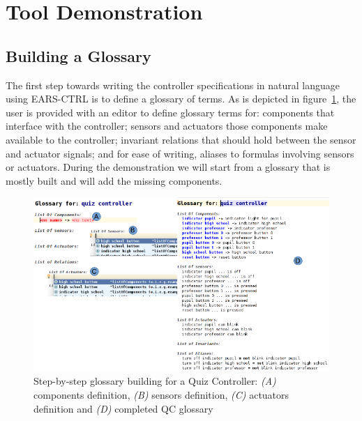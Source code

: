 \vspace{-.2cm}
\section{Tool Demonstration}
\label{sec:demo}
\subsection{Building a Glossary}
\vspace{-.1cm}
The first step towards writing the controller specifications in natural
language using \textsf{EARS-CTRL} is to define a glossary of terms. 
As is depicted in figure~\ref{fig:glossary_def}, the user is provided with an
editor to define glossary terms for: components that interface
with the controller; sensors and actuators those components make
available to the controller; invariant relations that should hold
between the sensor and actuator signals; and for ease of writing,
aliases to formulas involving sensors or actuators. During the demonstration we
will start from a glossary that is mostly built and will add the missing
components.
 
\vspace{-.2cm}
\begin{figure}[!h]
\centering
\includegraphics[width=1\textwidth]{./images/QC_Glossary_Def.png}
\caption{Step-by-step glossary building for a Quiz Controller: \emph{(A)}
components definition, \emph{(B)} sensors definition, \emph{(C)} actuators
definition and \emph{(D)} completed QC glossary}
\vspace{-.8cm}
\label{fig:glossary_def}
\end{figure}

